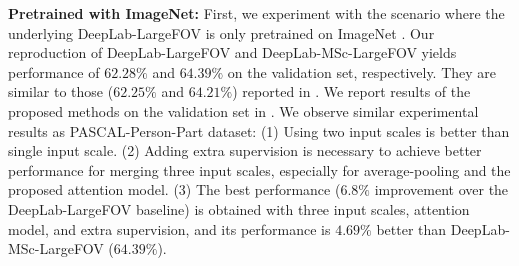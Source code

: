 \textbf{Pretrained with ImageNet:} First, we experiment with the scenario where the underlying DeepLab-LargeFOV is only pretrained on ImageNet \cite{ILSVRC15}. Our reproduction of DeepLab-LargeFOV and DeepLab-MSc-LargeFOV yields performance of $62.28\%$ and $64.39\%$ on the validation set, respectively. They are similar to those ($62.25\%$ and $64.21\%$) reported in \cite{chen2014semantic}. We report results of the proposed methods on the validation set in . We observe similar experimental results as PASCAL-Person-Part dataset: (1) Using two input scales is better than single input scale. (2) Adding extra supervision is necessary to achieve better performance for merging three input scales, especially for average-pooling and the proposed attention model. (3) The best performance ($6.8\%$ improvement over the DeepLab-LargeFOV baseline) is obtained with three input scales, attention model, and extra supervision, and its performance is $4.69\%$ better than DeepLab-MSc-LargeFOV ($64.39\%$).


